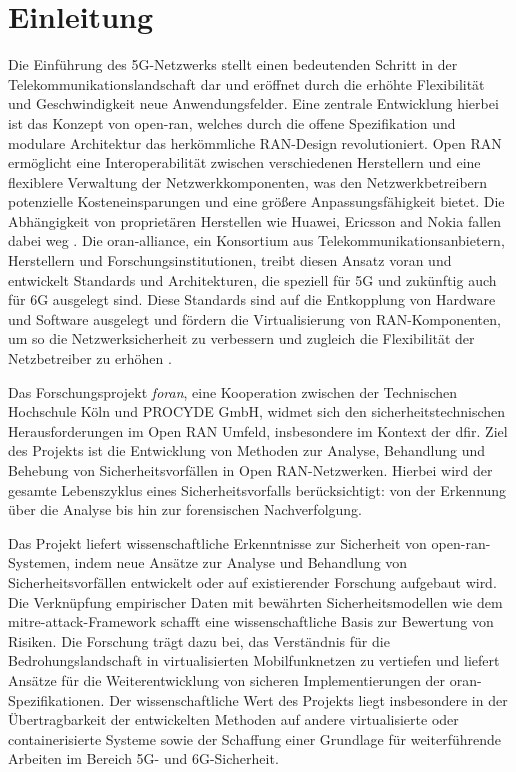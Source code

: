 \chapter{Einleitung}
\label{chap:Einleitung}

\par
Die Einführung des 5G-Netzwerks stellt einen bedeutenden Schritt in der Telekommunikationslandschaft dar und eröffnet durch die erhöhte Flexibilität und Geschwindigkeit neue Anwendungsfelder. Eine zentrale Entwicklung hierbei ist das Konzept von \gls{open-ran}, welches durch die offene Spezifikation und modulare Architektur das herkömmliche RAN-Design revolutioniert. Open RAN ermöglicht eine Interoperabilität zwischen verschiedenen Herstellern und eine flexiblere Verwaltung der Netzwerkkomponenten, was den Netzwerkbetreibern potenzielle Kosteneinsparungen und eine größere Anpassungsfähigkeit bietet. Die Abhängigkeit von proprietären Herstellen wie Huawei, Ericsson and Nokia fallen dabei weg \autocite{NokiaEricssonUnd}. Die \gls{oran-alliance}, ein Konsortium aus Telekommunikationsanbietern, Herstellern und Forschungsinstitutionen, treibt diesen Ansatz voran und entwickelt Standards und Architekturen, die speziell für 5G und zukünftig auch für 6G ausgelegt sind. Diese Standards sind auf die Entkopplung von Hardware und Software ausgelegt und fördern die Virtualisierung von RAN-Komponenten, um so die Netzwerksicherheit zu verbessern und zugleich die Flexibilität der Netzbetreiber zu erhöhen \autocite{5GFORAN}.
\par
Das Forschungsprojekt \textit{\gls{foran}}, eine Kooperation zwischen der Technischen Hochschule Köln und PROCYDE GmbH, widmet sich den sicherheitstechnischen Herausforderungen im Open RAN Umfeld, insbesondere im Kontext der \gls{dfir}. Ziel des Projekts ist die Entwicklung von Methoden zur Analyse, Behandlung und Behebung von Sicherheitsvorfällen in Open RAN-Netzwerken. Hierbei wird der gesamte Lebenszyklus eines Sicherheitsvorfalls berücksichtigt: von der Erkennung über die Analyse bis hin zur forensischen Nachverfolgung. 
\par Das Projekt liefert wissenschaftliche Erkenntnisse zur Sicherheit von \gls{open-ran}-Systemen, indem neue Ansätze zur Analyse und Behandlung von Sicherheitsvorfällen entwickelt oder auf existierender Forschung aufgebaut wird. Die Verknüpfung empirischer Daten mit bewährten Sicherheitsmodellen wie dem \gls{mitre}-\gls{attack}-Framework schafft eine wissenschaftliche Basis zur Bewertung von Risiken. Die Forschung trägt dazu bei, das Verständnis für die Bedrohungslandschaft in virtualisierten Mobilfunknetzen zu vertiefen und liefert Ansätze für die Weiterentwicklung von sicheren Implementierungen der \gls{oran}-Spezifikationen. Der wissenschaftliche Wert des Projekts liegt insbesondere in der Übertragbarkeit der entwickelten Methoden auf andere virtualisierte oder containerisierte Systeme sowie der Schaffung einer Grundlage für weiterführende Arbeiten im Bereich 5G- und 6G-Sicherheit.
